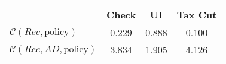\begin{tabular}{@{}lccc@{}}
\toprule
                          & Check      & UI    & Tax Cut    \\  \midrule
$\mathcal{C}(Rec,\text{policy})$ & 0.229  & 0.888  & 0.100     \\
$\mathcal{C}(Rec, AD,\text{policy})$ & 3.834  & 1.905  & 4.126     \\
\end{tabular}
